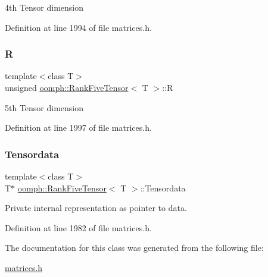 4th Tensor dimension 



Definition at line 1994 of file matrices.\+h.

\mbox{\label{classoomph_1_1RankFiveTensor_a0c348e8860783caf59103dd86f38d1a6}} 
\subsubsection{\texorpdfstring{R}{R}}
{\footnotesize\ttfamily template$<$class T$>$ \\
unsigned \hyperlink{classoomph_1_1RankFiveTensor}{oomph\+::\+Rank\+Five\+Tensor}$<$ T $>$\+::R\hspace{0.3cm}{\ttfamily [private]}}



5th Tensor dimension 



Definition at line 1997 of file matrices.\+h.

\mbox{\label{classoomph_1_1RankFiveTensor_ae93e781da0ba64c2c5403099dc75dd3d}} 
\subsubsection{\texorpdfstring{Tensordata}{Tensordata}}
{\footnotesize\ttfamily template$<$class T$>$ \\
T$\ast$ \hyperlink{classoomph_1_1RankFiveTensor}{oomph\+::\+Rank\+Five\+Tensor}$<$ T $>$\+::Tensordata\hspace{0.3cm}{\ttfamily [private]}}



Private internal representation as pointer to data. 



Definition at line 1982 of file matrices.\+h.



The documentation for this class was generated from the following file\+:\begin{DoxyCompactItemize}
\item 
\hyperlink{matrices_8h}{matrices.\+h}\end{DoxyCompactItemize}
